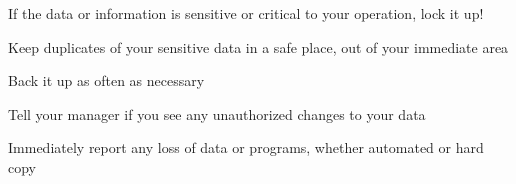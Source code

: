 \begin{htmllist}
If the data or information is sensitive or critical to your operation,
lock it up!


\item[Back Up Your Data]

Keep duplicates of your sensitive data in a safe place, out of your
immediate area

Back it up as often as necessary


\item[Report Security Violations]

Tell your manager if you see any unauthorized changes to your data

Immediately report any loss of data or programs, whether automated or
hard copy

\end{htmllist}
